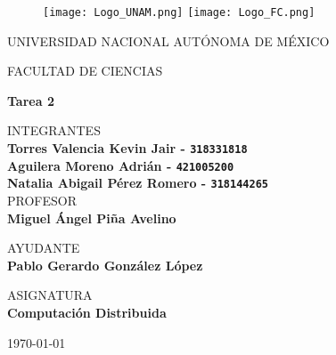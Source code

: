 \thispagestyle{empty}

\begin{figure}[ht]
  \texttt{[image: Logo\_UNAM.png]}
  \label{EscudoUNAM}
  \endminipage
  \texttt{[image: Logo\_FC.png]}
  \label{EscudoFC}
  \endminipage
\end{figure}

\begin{center}
  \vspace{0.8cm}
  \LARGE
  UNIVERSIDAD NACIONAL AUTÓNOMA DE MÉXICO 
  
  \vspace{0.7cm}
  \LARGE
  FACULTAD DE CIENCIAS
  
  \vspace{0.8 cm}	
  \Large
  \textbf{Tarea 2}

  \vspace{0.8 cm}
  \normalsize	
  INTEGRANTES \\
  \vspace{.2cm}
  \large
  \textbf{Torres Valencia Kevin Jair - \texttt{318331818}}\\
  \textbf{Aguilera Moreno Adrián - \texttt{421005200}}\\
  \textbf{Natalia Abigail Pérez Romero  - \texttt{318144265}}\\
  
  \vspace{1 cm}
  \normalsize	
  PROFESOR \\
  \vspace{.2cm}
  \large
  \textbf{Miguel Ángel Piña Avelino}
  
  \vspace{1 cm}
  AYUDANTE \\
  \vspace{.2cm}
  \large
  \textbf{Pablo Gerardo González López}
  \vspace{1.3cm}
  
  \normalsize	
  ASIGNATURA \\
  \vspace{.2cm}
  \large
  \textbf{Computación Distribuida}
  
  \vspace{1 cm}
  \today
\end{center}
